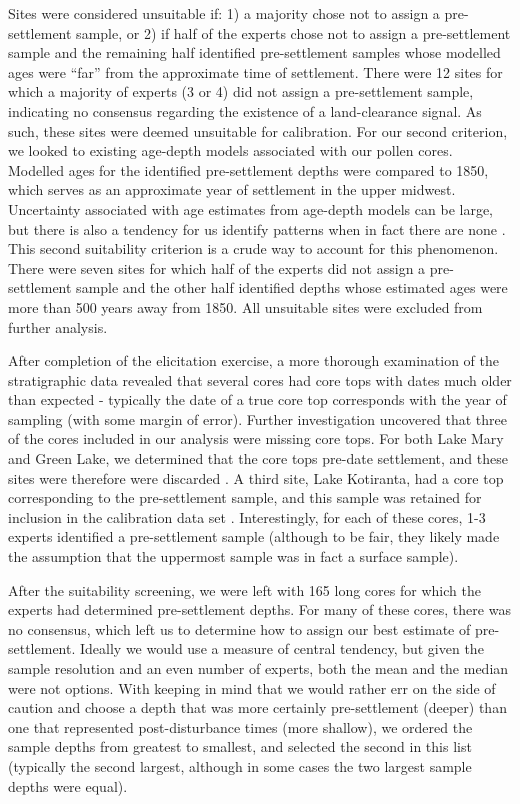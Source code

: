 \documentclass[12pt]{article}
\begin{document}
Sites were considered unsuitable if: 1) a majority chose not to
assign a pre-settlement sample, or 2) if half of the experts chose not
to assign a pre-settlement sample and the remaining half identified
pre-settlement samples whose modelled ages were ``far'' from the
approximate time of settlement. There were 12 sites for which a
majority of experts (3 or 4) did not assign a pre-settlement sample,
indicating no consensus regarding the existence of a land-clearance
signal. As such, these sites were deemed unsuitable for
calibration. For our second criterion, we looked to existing age-depth
models associated with our pollen cores. Modelled ages for the
identified pre-settlement depths were compared to 1850, which serves
as an approximate year of settlement in the upper midwest. Uncertainty
associated with age estimates from age-depth models can be large, but
there is also a tendency for us identify patterns when in fact there
are none \cite{XXX}. This second suitability criterion is a crude way to account
for this phenomenon.  There were seven sites for which half of the
experts did not assign a pre-settlement sample and the other half
identified depths whose estimated ages were more than 500 years away from
1850. All unsuitable sites were excluded from further analysis.

After completion of the elicitation exercise, a more thorough
examination of the stratigraphic data revealed that several cores had
core tops with dates much older than expected - typically the date of
a true core top corresponds with the year of sampling (with some
margin of error). Further investigation uncovered that three of the
cores included in our analysis were missing core tops. For both Lake
Mary and Green Lake, we determined that the core tops pre-date
settlement, and these sites were therefore were discarded
\cite{lawrenz1979, XXX}. A third site, Lake Kotiranta, had a core top
corresponding to the pre-settlement sample, and this sample was
retained for inclusion in the calibration data set
\cite{wright1969}. Interestingly, for each of these cores, 1-3 experts
identified a pre-settlement sample (although to be fair, they likely
made the assumption that the uppermost sample was in fact a surface
sample).

After the suitability screening, we were left with 165 long cores for
which the experts had determined pre-settlement depths. For many of
these cores, there was no consensus, which left us to determine how to
assign our best estimate of pre-settlement. Ideally we would use a
measure of central tendency, but given the sample resolution and an
even number of experts, both the mean and the median were not
options. With keeping in mind that we would rather err on the side of
caution and choose a depth that was more certainly pre-settlement (deeper) than
one that represented post-disturbance times (more shallow), we ordered the sample
depths from greatest to smallest, and selected the second in this list
(typically the second largest, although in some cases the two largest
sample depths were equal).
\end{document}
